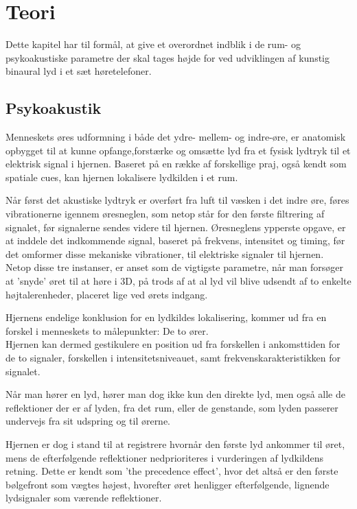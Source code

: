\chapter{Teori}
Dette kapitel har til formål, at give et overordnet indblik i de rum- og psykoakustiske parametre der skal tages højde for ved udviklingen af kunstig binaural lyd i et sæt høretelefoner. 
 
\section{Psykoakustik}

Menneskets øres udformning i både det ydre- mellem- og indre-øre, er anatomisk opbygget til at kunne opfange,forstærke og omsætte lyd fra et fysisk lydtryk til et elektrisk signal i hjernen. Baseret på en række af forskellige praj, også kendt som spatiale cues, kan hjernen lokalisere lydkilden i et rum.

Når først det akustiske lydtryk er overført fra luft til væsken i det indre øre, føres vibrationerne igennem øresneglen, som netop står for den første filtrering af signalet, før signalerne sendes videre til hjernen. 
Øresneglens ypperste opgave, er at inddele det indkommende signal, baseret på frekvens, intensitet og timing, før det omformer disse mekaniske vibrationer, til elektriske signaler til hjernen. 
Netop disse tre instanser, er anset som de vigtigste parametre, når man forsøger at 'snyde' øret til at høre i 3D, på trods af at al lyd vil blive udsendt af to enkelte højtalerenheder, placeret lige ved ørets indgang. 
 
Hjernens endelige konklusion for en lydkildes lokalisering, kommer ud fra en forskel i menneskets to målepunkter: De to ører. \\
Hjernen kan dermed gestikulere en position ud fra forskellen i ankomsttiden for de to signaler, forskellen i intensitetsniveauet, samt frekvenskarakteristikken for signalet. 

Når man hører en lyd, hører man dog ikke kun den direkte lyd, men også alle de reflektioner der er af lyden, fra det rum, eller de genstande, som lyden passerer undervejs fra sit udspring og til ørerne. 

Hjernen er dog i stand til at registrere hvornår den første lyd ankommer til øret, mens de efterfølgende reflektioner nedprioriteres i vurderingen af lydkildens retning. Dette er kendt som 'the precedence effect'\cite{SpatialBook}, hvor det altså er den første bølgefront som vægtes højest, hvorefter øret henligger efterfølgende, lignende lydsignaler som værende reflektioner. 

